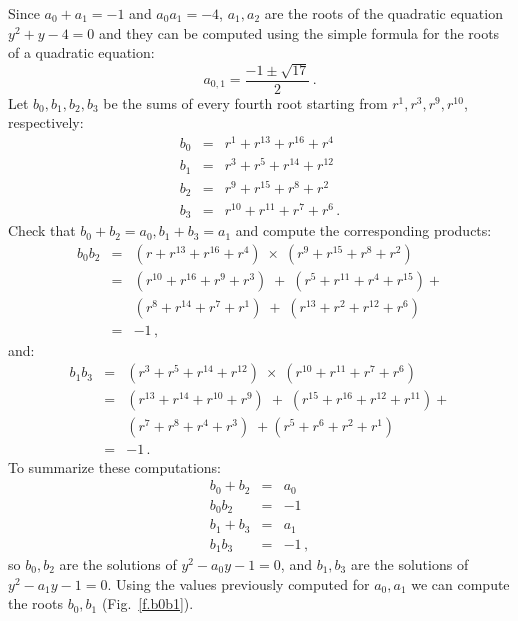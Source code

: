 Since $a_0+a_1=-1$ and $a_0 a_1=-4$, $a_1,a_2$ are the roots of the quadratic equation $y^2+y-4=0$ and they can be computed using the simple formula for the roots of a quadratic equation:
\[
a_{0,1} = \frac{-1\pm\sqrt{17}}{2}\,.
\]
Let $b_0,b_1,b_2,b_3$ be the sums of every fourth root starting from $r^1,r^3,r^9,r^{10}$, respectively:
\begin{eqnarray*}
b_0&=& r^1+ r^{13} + r^{16} + r^4\\
b_1&=& r^3+ r^{5} + r^{14} + r^{12}\\
b_2&=& r^9+ r^{15} + r^{8} + r^2\\
b_3&=& r^{10}+ r^{11} + r^{7} + r^6\,.
\end{eqnarray*}
Check that $b_0+b_2=a_0, b_1+b_3=a_1$ and compute the corresponding products:
\begin{eqnarray*}
b_0b_2&=&(r + r^{13} + r^{16} +r^4)\;\times\;(r^9 + r^{15} + r^{8} +r^{2})\\
&=&(r^{10}+r^{16}+r^9+r^3)\;+\;(r^{5}+r^{11}+r^4+r^{15})+\\
&&(r^{8}+r^{14}+r^7+r^1)\;+\;(r^{13}+r^{2}+r^{12}+r^6)\\
&=&-1\,,
\end{eqnarray*}
and:
\begin{eqnarray*}
b_1b_3&=&(r^3 + r^{5} + r^{14} +r^{12})\;\times\;(r^{10} + r^{11} + r^{7} +r^{6})\\
&=&(r^{13}+r^{14}+r^{10}+r^9)\;+\;(r^{15}+r^{16}+r^{12}+r^{11})+\\
&&(r^{7}+r^{8}+r^4+r^3)\;+(r^{5}+r^{6}+r^{2}+r^1)\\
&=&-1\,.
\end{eqnarray*}
To summarize these computations:
\begin{eqnarray*}
b_0+b_2&=&a_0\\
b_0b_2&=&-1\\
b_1+b_3&=&a_1\\
b_1b_3&=&-1\,,
\end{eqnarray*}
so $b_0,b_2$ are the solutions of $y^2-a_0y-1= 0$, and $b_1,b_3$ are the solutions of $y^2-a_1y-1 =0$. Using the values previously computed for $a_0,a_1$ we can compute the roots $b_0,b_1$ (Fig.~\ref{f.b0b1}).
